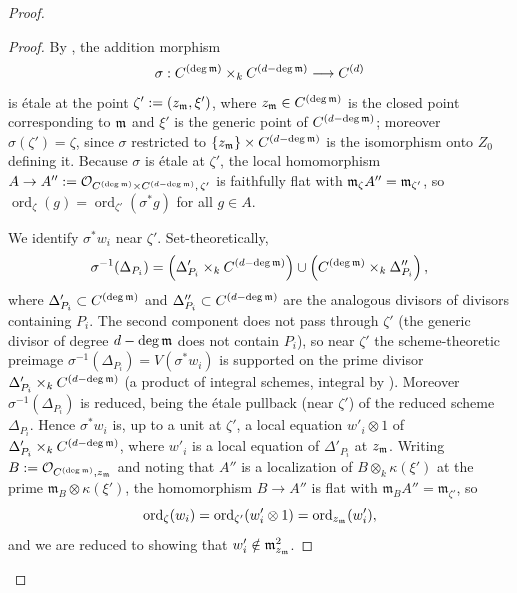 \begin{proof}
\begin{proof}
        By , the addition morphism
        \[ \sigma : C^{(\deg\mathfrak{m})} \times_k C^{(d - \deg\mathfrak{m})} \longrightarrow C^{(d)} \]
        is \'etale at the point $\zeta' := (z_{\mathfrak{m}}, \xi')$, where $z_{\mathfrak{m}} \in C^{(\deg\mathfrak{m})}$ is the
        closed point corresponding to $\mathfrak{m}$ and $\xi'$ is the generic point of $C^{(d-\deg\mathfrak{m})}$;
        moreover $\sigma(\zeta') = \zeta$, since $\sigma$ restricted to
        $\{z_{\mathfrak{m}}\} \times C^{(d-\deg\mathfrak{m})}$ is the isomorphism onto $Z_0$ defining it.
        Because $\sigma$ is \'etale at $\zeta'$, the local homomorphism
        $A \to A'' := \mathcal{O}_{C^{(\deg\mathfrak{m})} \times C^{(d-\deg\mathfrak{m})},\, \zeta'}$ is faithfully flat with
        $\mathfrak{m}_\zeta A'' = \mathfrak{m}_{\zeta'}$, so $\operatorname{ord}_\zeta(g) =
        \operatorname{ord}_{\zeta'}(\sigma^* g)$ for all $g \in A$.

        We identify $\sigma^* w_i$ near $\zeta'$. Set-theoretically,
        \[ \sigma^{-1}(\Delta_{P_i}) =
        \left( \Delta'_{P_i} \times_k C^{(d - \deg\mathfrak{m})} \right) \cup
        \left( C^{(\deg\mathfrak{m})} \times_k \Delta''_{P_i} \right), \]
        where $\Delta'_{P_i} \subset C^{(\deg\mathfrak{m})}$ and $\Delta''_{P_i} \subset C^{(d-\deg\mathfrak{m})}$ are
        the analogous divisors of divisors containing $P_i$. The second component does not pass through
        $\zeta'$ (the generic divisor of degree $d - \deg\mathfrak{m}$ does not contain $P_i$), so near
        $\zeta'$ the scheme-theoretic preimage $\sigma^{-1}(\Delta_{P_i}) = V(\sigma^* w_i)$ is
        supported on the prime divisor $\Delta'_{P_i} \times_k C^{(d-\deg\mathfrak{m})}$ (a product of
        integral schemes, integral by ). Moreover
        $\sigma^{-1}(\Delta_{P_i})$ is reduced, being the \'etale pullback (near $\zeta'$) of the reduced
        scheme $\Delta_{P_i}$. Hence $\sigma^* w_i$ is, up to a unit at $\zeta'$, a local equation
        $w'_i \otimes 1$ of $\Delta'_{P_i} \times_k C^{(d-\deg\mathfrak{m})}$, where $w'_i$ is a local equation
        of $\Delta'_{P_i}$ at $z_{\mathfrak{m}}$. Writing $B := \mathcal{O}_{C^{(\deg\mathfrak{m})}, z_{\mathfrak{m}}}$ and noting that
        $A''$ is a localization of $B \otimes_k \kappa(\xi')$ at the prime $\mathfrak{m}_B \otimes \kappa(\xi')$,
        the homomorphism $B \to A''$ is flat with $\mathfrak{m}_B A'' = \mathfrak{m}_{\zeta'}$, so
        \[ \operatorname{ord}_\zeta(w_i) = \operatorname{ord}_{\zeta'}(w'_i \otimes 1)
           = \operatorname{ord}_{z_{\mathfrak{m}}}(w'_i), \]
        and we are reduced to showing that $w'_i \notin \mathfrak{m}_{z_{\mathfrak{m}}}^2$.


\end{proof}
\end{proof}
